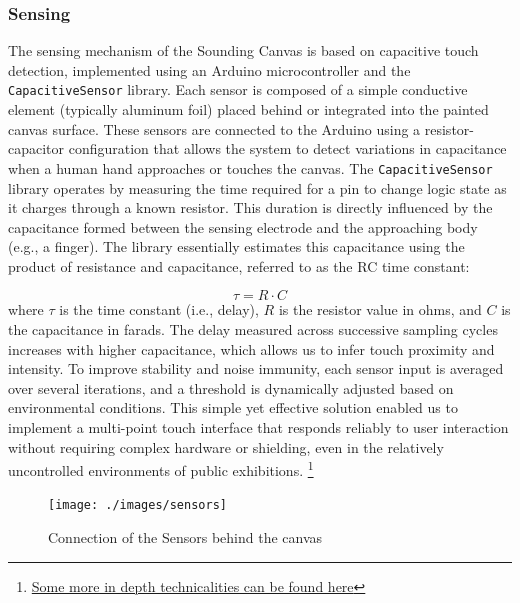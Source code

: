 \documentclass{article}
\begin{document}
\subsubsection{Sensing}
The sensing mechanism of the Sounding Canvas is based on capacitive touch detection, implemented using an Arduino microcontroller and the \texttt{CapacitiveSensor} library. Each sensor is composed of a simple conductive element (typically aluminum foil) placed behind or integrated into the painted canvas surface. These sensors are connected to the Arduino using a resistor-capacitor configuration that allows the system to detect variations in capacitance when a human hand approaches or touches the canvas. \newline
The \texttt{CapacitiveSensor} library operates by measuring the time required for a pin to change logic state as it charges through a known resistor. This duration is directly influenced by the capacitance formed between the sensing electrode and the approaching body (e.g., a finger). The library essentially estimates this capacitance using the product of resistance and capacitance, referred to as the RC time constant:

\[
\tau = R \cdot C
\]
\noindent
where \( \tau \) is the time constant (i.e., delay), \( R \) is the resistor value in ohms, and \( C \) is the capacitance in farads. The delay measured across successive sampling cycles increases with higher capacitance, which allows us to infer touch proximity and intensity. \newline 
To improve stability and noise immunity, each sensor input is averaged over several iterations, and a threshold is dynamically adjusted based on environmental conditions. This simple yet effective solution enabled us to implement a multi-point touch interface that responds reliably to user interaction without requiring complex hardware or shielding, even in the relatively uncontrolled environments of public exhibitions.
\footnote{\href{https://luciamarock.github.io/Projects/technicalities/tech\_report.html}{Some more in depth technicalities can be found here}}
\begin{figure}[h]
	\centering
	\texttt{[image: ./images/sensors]}
	\caption{Connection of the Sensors behind the canvas}
	\label{fig:sensors}
\end{figure}
\end{document}
